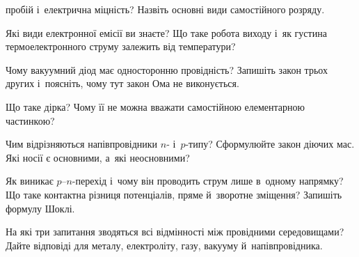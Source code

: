 \begin{Questions}
\begin{quizlist}
		  пробій і~електрична міцність? Назвіть основні види самостійного розряду.
		\item Які види електронної емісії ви знаєте? Що таке робота виходу і~як густина
		  термоелектронного струму залежить від температури?
		\item Чому вакуумний діод має односторонню провідність? Запишіть
		  закон трьох других і~поясніть, чому тут закон Ома не виконується.
		\item Що таке дірка? Чому її не можна вважати самостійною елементарною частинкою?
		\item Чим відрізняються напівпровідники $n$- і~$p$-типу? Сформулюйте закон діючих
		  мас. Які носії є основними, а~які неосновними?
		\item Як виникає $p$--$n$-перехід і~чому він проводить струм лише в~одному
		  напрямку? Що таке контактна різниця потенціалів, пряме й~зворотне зміщення?
		  Запишіть формулу Шоклі.
		\item На які три запитання зводяться всі відмінності між провідними середовищами?
		  Дайте відповіді для металу, електроліту, газу, вакууму й~напівпровідника.
	\end{quizlist}
\end{Questions}

